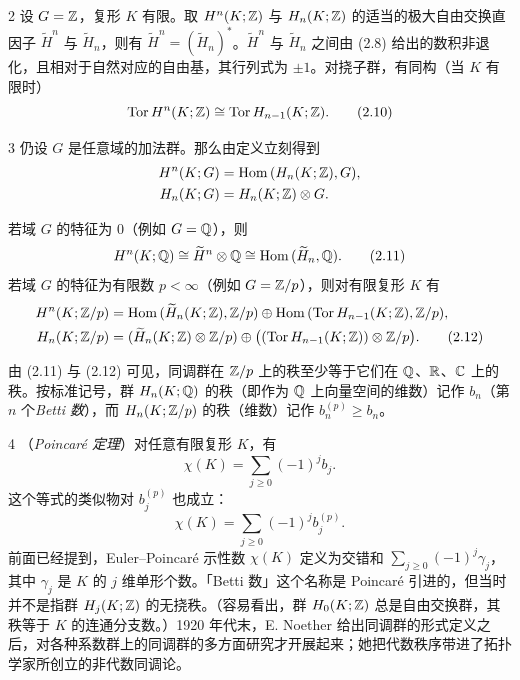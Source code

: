 \begin{example*}{2}
设 $G=\mathbb{Z}$，复形 $K$ 有限。取 $H^n(K;\mathbb{Z})$ 与 $H_n(K;\mathbb{Z})$ 的适当的极大自由交换直因子 $\widetilde{H}^n$ 与 $\widetilde{H}_n$，则有 $\widetilde{H}^n=(\widetilde{H}_n)^{*}$。$\widetilde{H}^n$ 与 $\widetilde{H}_n$ 之间由 (2.8) 给出的数积非退化，且相对于自然对应的自由基，其行列式为 $\pm 1$。对挠子群，有同构（当 $K$ 有限时）
\begin{equation}
  \operatorname{Tor} H^n(K;\mathbb{Z})\cong \operatorname{Tor} H_{n-1}(K;\mathbb{Z}). \tag{2.10}
\end{equation}
\end{example*}

\begin{example*}{3}
仍设 $G$ 是任意域的加法群。那么由定义立刻得到
\begin{align*}
  H^n(K;G) &= \operatorname{Hom}\,(H_n(K;\mathbb{Z}),G),\\
  H_n(K;G) &= H_n(K;\mathbb{Z})\otimes G.
\end{align*}
\end{example*}
若域 $G$ 的特征为 0（例如 $G=\mathbb{Q}$），则
\begin{equation}
  H^n(K;\mathbb{Q})\cong \widetilde{H}^n\otimes\mathbb{Q}\cong \operatorname{Hom}\,(\widetilde{H}_n,\mathbb{Q}). \tag{2.11}
\end{equation}
若域 $G$ 的特征为有限数 $p<\infty$（例如 $G=\mathbb{Z}/p$），则对有限复形 $K$ 有
\begin{align}
  H^n(K;\mathbb{Z}/p) &= \operatorname{Hom}\,(\widetilde{H}_n(K;\mathbb{Z}),\mathbb{Z}/p)
    \oplus\operatorname{Hom}\,(\operatorname{Tor} H_{n-1}(K;\mathbb{Z}),\mathbb{Z}/p),\notag\\
  H_n(K;\mathbb{Z}/p) &= (\widetilde{H}_n(K;\mathbb{Z})\otimes\mathbb{Z}/p)
    \oplus\bigl((\operatorname{Tor} H_{n-1}(K;\mathbb{Z}))\otimes\mathbb{Z}/p\bigr). \tag{2.12}
\end{align}

由 (2.11) 与 (2.12) 可见，同调群在 $\mathbb{Z}/p$ 上的秩至少等于它们在 $\mathbb{Q}$、$\mathbb{R}$、$\mathbb{C}$ 上的秩。按标准记号，群 $H_n(K;\mathbb{Q})$ 的秩（即作为 $\mathbb{Q}$ 上向量空间的维数）记作 $b_n$（第 $n$ 个\emph{Betti 数}），而 $H_n(K;\mathbb{Z}/p)$ 的秩（维数）记作 $b_n^{(p)}\ge b_n$。

\begin{example}{4}
（\emph{Poincaré 定理}）对任意有限复形 $K$，有
\begin{equation}
  \chi(K)=\sum_{j\ge 0}(-1)^j b_j. \tag{2.13}
\end{equation}
这个等式的类似物对 $b_j^{(p)}$ 也成立：
\begin{equation}
  \chi(K)=\sum_{j\ge 0}(-1)^j b_j^{(p)}. \tag{2.14}
\end{equation}
前面已经提到，Euler--Poincaré 示性数 $\chi(K)$ 定义为交错和 $\sum_{j\ge 0}(-1)^j\gamma_j$，其中 $\gamma_j$ 是 $K$ 的 $j$ 维单形个数。「Betti 数」这个名称是 Poincaré 引进的，但当时并不是指群 $H_j(K;\mathbb{Z})$ 的无挠秩。（容易看出，群 $H_0(K;\mathbb{Z})$ 总是自由交换群，其秩等于 $K$ 的连通分支数。）1920 年代末，E. Noether 给出同调群的形式定义之后，对各种系数群上的同调群的多方面研究才开展起来；她把代数秩序带进了拓扑学家所创立的非代数同调论。
\end{example}

